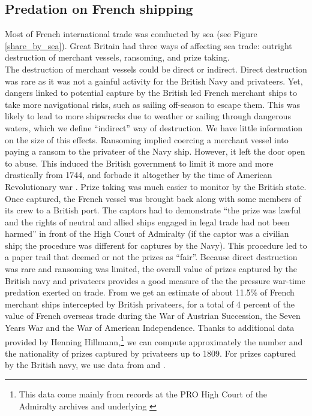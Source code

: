 \documentclass[12pt,a4paper,notitlepage,english]{article}
\begin{document}
\subsection{Predation on French shipping}\label{sec:DestructionofFrenchshipping}
Most of French international trade was conducted by sea (see Figure \ref{share_by_sea}). 
Great Britain had three ways of affecting sea trade: outright destruction of merchant vessels, ransoming, and prize taking.\\
The destruction of merchant vessels could be direct or indirect. Direct destruction was rare as it was not a gainful activity for the British Navy and privateers.
Yet, dangers linked to potential capture by the British led French merchant ships to take more navigational risks, such as sailing off-season to escape them. This was likely to lead to more shipwrecks due to weather or sailing through dangerous waters, which we define ``indirect'' way of destruction. We have little information on the size of this effects.
Ransoming implied coercing a merchant vessel into paying a ransom to the privateer of the Navy ship. However, it left the door open to abuse. This induced the British government to limit it more and more drastically from 1744, and forbade it altogether by the time of American Revolutionary war \cite[see][p. 734]{Hillmann2011}. 
Prize taking was much easier to monitor by the British state.
Once captured, the French vessel was brought back along with some members of its crew to a British port.
The captors had to demonstrate ``the prize was lawful and the rights of neutral and allied ships engaged in legal trade had not been harmed'' \cite[see][p. 734]{Hillmann2011} in front of the High Court of Admiralty (if the captor was a civilian ship; the procedure was different for captures by the Navy).
This procedure led to a paper trail that deemed or not the prizes as ``fair''.
Because direct destruction was rare and ransoming was limited, the overall value of prizes captured by the British navy and privateers provides a good measure of the the pressure war-time predation exerted on trade.
From \cite{Hillmann2011} we get an estimate of about 11.5\% of French merchant ships intercepted by British privateers, for a total of 4 percent of the value of French overseas trade during the War of Austrian Succession, the Seven Years War and the War of American Independence.
Thanks to additional data provided by Henning Hillmann,\footnote{This data come mainly from records at the PRO High Court of the Admiralty archives and underlying \cite{Hillmann2011}} we can compute approximately the number and the nationality of prizes captured by privateers up to 1809. For prizes captured by the British navy, we use data from \cite{Starkey1990} and \cite{Benjamin2009}. 
\end{document}
